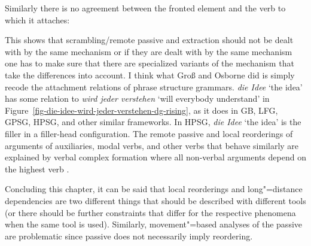 Similarly there is no agreement between the fronted element and the verb to which it attaches:
\eal
{}

\zl
This shows that scrambling/remote passive and extraction should not be dealt with by the same mechanism or if they
are dealt with by the same mechanism one has to make sure that there are specialized variants of the
mechanism that take the differences into account. 
I think what Groß and Osborne did is simply recode the attachment relations of phrase structure
grammars. \emph{die Idee} `the idea' has some relation to \emph{wird jeder verstehen} `will
everybody understand' in Figure~\ref{fig-die-idee-wird-jeder-verstehen-dg-rising}, as it does in GB, LFG, GPSG, HPSG, and
other similar frameworks. In HPSG, \emph{die Idee} `the idea' is the filler in a filler-head configuration. The remote
passive and local reorderings of arguments of auxiliaries, modal verbs, and other verbs that behave similarly
are explained by verbal complex formation where all non-verbal arguments depend on the highest verb \citep{HN94a}.

Concluding this chapter, it can be said that local reorderings and long"=distance dependencies are two
different things that should be described with different tools (or there should be further
constraints that differ for the respective phenomena when the same tool is used). Similarly, movement"=based analyses
of the passive are problematic since passive does not necessarily imply reordering. 





